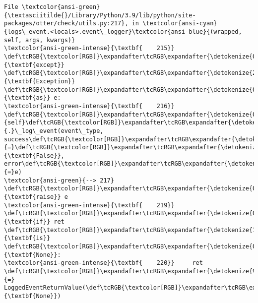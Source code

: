 \documentclass[11pt]{article}
\begin{document}
\begin{Verbatim}[commandchars=\\\{\}, frame=single, framerule=2mm, rulecolor=\color{outerrorbackground}]
File \textcolor{ansi-green}{\textasciitilde{}/Library/Python/3.9/lib/python/site-packages/otter/check/utils.py:217}, in \textcolor{ansi-cyan}{logs\_event.<locals>.event\_logger}\textcolor{ansi-blue}{(wrapped, self, args, kwargs)}
\textcolor{ansi-green-intense}{\textbf{    215}} \def\tcRGB{\textcolor[RGB]}\expandafter\tcRGB\expandafter{\detokenize{0,135,0}}{\textbf{except}} \def\tcRGB{\textcolor[RGB]}\expandafter\tcRGB\expandafter{\detokenize{215,95,95}}{\textbf{Exception}} \def\tcRGB{\textcolor[RGB]}\expandafter\tcRGB\expandafter{\detokenize{0,135,0}}{\textbf{as}} e:
\textcolor{ansi-green-intense}{\textbf{    216}}     \def\tcRGB{\textcolor[RGB]}\expandafter\tcRGB\expandafter{\detokenize{0,135,0}}{self}\def\tcRGB{\textcolor[RGB]}\expandafter\tcRGB\expandafter{\detokenize{98,98,98}}{.}\_log\_event(event\_type, success\def\tcRGB{\textcolor[RGB]}\expandafter\tcRGB\expandafter{\detokenize{98,98,98}}{=}\def\tcRGB{\textcolor[RGB]}\expandafter\tcRGB\expandafter{\detokenize{0,135,0}}{\textbf{False}}, error\def\tcRGB{\textcolor[RGB]}\expandafter\tcRGB\expandafter{\detokenize{98,98,98}}{=}e)
\textcolor{ansi-green}{--> 217}     \def\tcRGB{\textcolor[RGB]}\expandafter\tcRGB\expandafter{\detokenize{0,135,0}}{\textbf{raise}} e
\textcolor{ansi-green-intense}{\textbf{    219}} \def\tcRGB{\textcolor[RGB]}\expandafter\tcRGB\expandafter{\detokenize{0,135,0}}{\textbf{if}} ret \def\tcRGB{\textcolor[RGB]}\expandafter\tcRGB\expandafter{\detokenize{175,0,255}}{\textbf{is}} \def\tcRGB{\textcolor[RGB]}\expandafter\tcRGB\expandafter{\detokenize{0,135,0}}{\textbf{None}}:
\textcolor{ansi-green-intense}{\textbf{    220}}     ret \def\tcRGB{\textcolor[RGB]}\expandafter\tcRGB\expandafter{\detokenize{98,98,98}}{=} LoggedEventReturnValue(\def\tcRGB{\textcolor[RGB]}\expandafter\tcRGB\expandafter{\detokenize{0,135,0}}{\textbf{None}})


\end{Verbatim}
\end{document}
